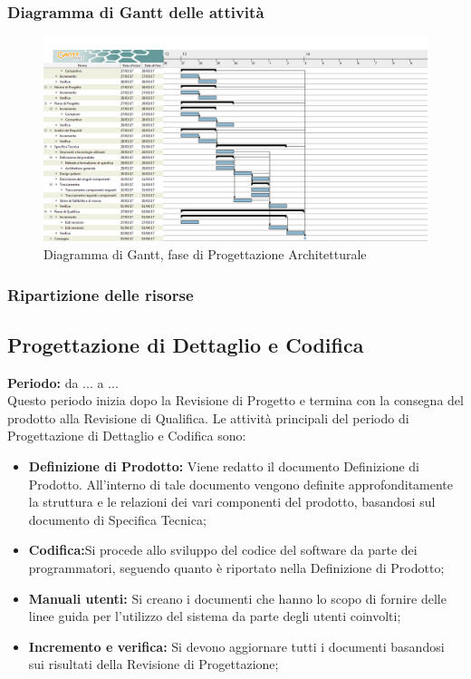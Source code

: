 	\subsubsection{Diagramma di Gantt delle attività}
	\begin{figure}[H]
		\centering
		\includegraphics[scale=0.30]{immagini/gantt/progettazione_architetturale.png}
		\caption{Diagramma di Gantt, fase di Progettazione Architetturale}
	\end{figure}
	\subsubsection{Ripartizione delle risorse}
	\subsection{Progettazione di Dettaglio e Codifica}
	\textbf{Periodo:} da ... a ... \\
	Questo periodo inizia dopo la Revisione di Progetto e termina con la consegna del prodotto alla Revisione di Qualifica. Le attività principali del periodo di Progettazione di Dettaglio e Codifica sono: \\
	\begin{itemize}
		\item \textbf{Definizione di Prodotto:} Viene redatto il documento Definizione di Prodotto. All'interno di tale documento vengono definite approfonditamente la struttura e le relazioni dei vari componenti del prodotto, basandosi sul documento di Specifica Tecnica; \\
		\item \textbf{Codifica:}Si procede allo sviluppo del codice del software da parte dei programmatori, seguendo quanto è riportato nella Definizione di Prodotto; \\
		\item \textbf{Manuali utenti:} Si creano i documenti che hanno lo scopo di fornire delle linee guida per l'utilizzo del sistema da parte degli utenti coinvolti; \\
		\item \textbf{Incremento e verifica:} Si devono aggiornare tutti i documenti basandosi sui risultati della Revisione di Progettazione; \\
	\end{itemize}
